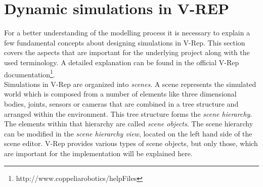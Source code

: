 
\section{Dynamic simulations in V-REP}
\label{sec:vrep_intro}

For a better understanding of the modelling process it is necessary to explain a few fundamental concepts about designing simulations in V-Rep. This section covers the aspects that are important for the underlying project along with the used terminology. A detailed explanation can be found in the official V-Rep documentation\footnote{http://www.coppeliarobotics/helpFiles}. \\

Simulations in V-Rep are organized into \emph{scenes}. A scene represents the simulated world which is composed from a number of elements like three dimensional bodies, joints, sensors or cameras that are combined in a tree structure and arranged within the environment. This tree structure forms the \emph{scene hierarchy}. The elements within that hierarchy are called \emph{scene objects}. The scene hierarchy can be modified in the \emph{scene hierarchy view}, located on the left hand side of the scene editor. V-Rep provides various types of scene objects, but only those, which are important for the implementation will be explained here.

